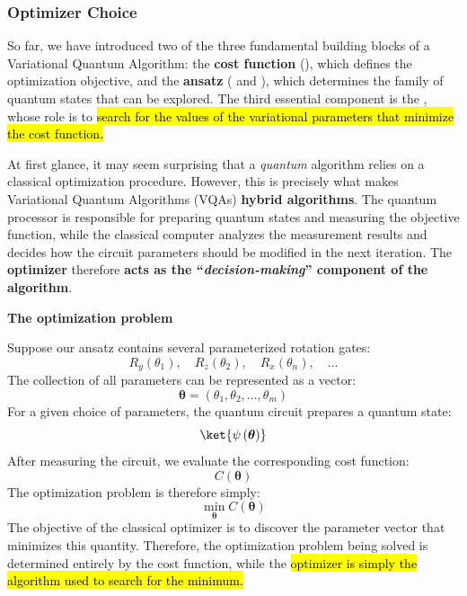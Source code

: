 \subsubsection{Optimizer Choice}\label{sec:optimizer-choice}

So far, we have introduced two of the three fundamental building blocks of a Variational Quantum Algorithm: the \textbf{cost function} (), which defines the optimization objective, and the \textbf{ansatz} ( and ), which determines the family of quantum states that can be explored. The third essential component is the , whose role is to \hl{search for the values of the variational parameters that minimize the cost function.}

\highspace
At first glance, it may seem surprising that a \emph{quantum} algorithm relies on a classical optimization procedure. However, this is precisely what makes Variational Quantum Algorithms (VQAs) \textbf{hybrid algorithms}. The quantum processor is responsible for preparing quantum states and measuring the objective function, while the classical computer analyzes the measurement results and decides how the circuit parameters should be modified in the next iteration. The \textbf{optimizer} therefore \textbf{acts as the ``\emph{decision-making}'' component of the algorithm}.

\highspace
\begin{flushleft}
    \textcolor{Green3}{ \textbf{The optimization problem}}
\end{flushleft}
Suppose our ansatz contains several parameterized rotation gates:
\begin{equation*}
    R_{y}\left(\theta_1\right), \quad R_{z}\left(\theta_2\right), \quad R_{x}\left(\theta_n\right), \quad \ldots
\end{equation*}
The collection of all parameters can be represented as a vector:
\begin{equation*}
    \boldsymbol{\theta} = \left(\theta_1, \theta_2, \ldots, \theta_m\right)
\end{equation*}
For a given choice of parameters, the quantum circuit prepares a quantum state:
\begin{equation*}
    \ket{\psi\left(\boldsymbol{\theta}\right)}
\end{equation*}
After measuring the circuit, we evaluate the corresponding cost function:
\begin{equation*}
    C\left(\boldsymbol{\theta}\right)
\end{equation*}
The optimization problem is therefore simply:
\begin{equation}
    \min_{\boldsymbol{\theta}} C\left(\boldsymbol{\theta}\right)
\end{equation}
The objective of the classical optimizer is to discover the parameter vector that minimizes this quantity. Therefore, the optimization problem being solved is determined entirely by the cost function, while the \hl{optimizer is simply the algorithm used to search for the minimum.}

